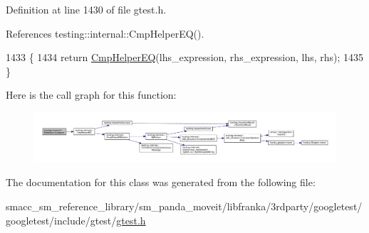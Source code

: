 Definition at line 1430 of file gtest.\+h.



References testing\+::internal\+::\+Cmp\+Helper\+E\+Q().


\begin{DoxyCode}
1433                                                  \{
1434     \textcolor{keywordflow}{return} \hyperlink{namespacetesting_1_1internal_a4638c74d9b32e971f9b321af6fafc2f1}{CmpHelperEQ}(lhs\_expression, rhs\_expression, lhs, rhs);
1435   \}
\end{DoxyCode}
Here is the call graph for this function\+:
\nopagebreak
\begin{figure}[H]
\begin{center}
\leavevmode
\includegraphics[width=350pt]{classtesting_1_1internal_1_1EqHelper_aaa42c0059bb3dcc43d556243febb5f1c_cgraph}
\end{center}
\end{figure}


The documentation for this class was generated from the following file\+:\begin{DoxyCompactItemize}
\item 
smacc\+\_\+sm\+\_\+reference\+\_\+library/sm\+\_\+panda\+\_\+moveit/libfranka/3rdparty/googletest/googletest/include/gtest/\hyperlink{gtest_8h}{gtest.\+h}\end{DoxyCompactItemize}
